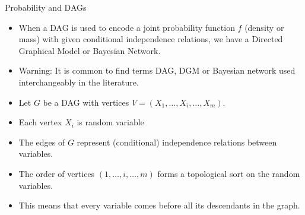 \documentclass[handout]{beamer}
\begin{document}
\begin{frame}{Probability and DAGs}
\scriptsize{
\begin{itemize}

\item When a DAG is used to encode a joint probability function $f$ (density or mass) with given conditional independence relations, we have a Directed Graphical Model or Bayesian Network.

\item Warning: It is common to find terms DAG, DGM or Bayesian network used interchangeably in the literature. 


\item Let $G$ be a DAG with vertices $V = (X_1 , \dots , X_i, \dots, X_m )$. 
\item Each vertex $X_i$ is random variable


\item The edges of $G$ represent (conditional) independence relations between variables.



\item The order of vertices $(1,\dots,i,\dots,m)$ forms a topological sort on the random variables.

\item This means that every variable comes before all its descendants in the graph.





\end{itemize}



} 

\end{frame}
\end{document}
